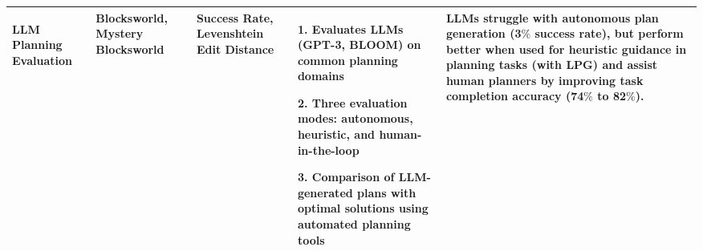 \begin{table*}[!h]
{\begin{tabular}{|p{2.8cm}|p{2.2cm}|p{3.0cm}|p{5.5cm}|p{6.0cm}|}
\hline
LLM Planning Evaluation \par \cite{valmeekam2023planning} & Blocksworld, Mystery Blocksworld & Success Rate, Levenshtein Edit Distance & 1. Evaluates LLMs (GPT-3, BLOOM) on common planning domains \par 2. Three evaluation modes: autonomous, heuristic, and human-in-the-loop \par 3. Comparison of LLM-generated plans with optimal solutions using automated planning tools & LLMs struggle with autonomous plan generation (3$\%$ success rate), but perform better when used for heuristic guidance in planning tasks (with LPG) and assist human planners by improving task completion accuracy (74$\%$ to 82$\%$).\\

\hline

\end{tabular}
}
\label{tab:foundation_1}
\end{table*}


